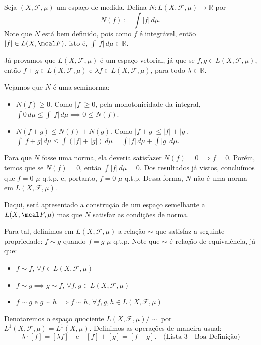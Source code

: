 Seja $(X, \mathcal{F}, \mu)$ um espaço de medida. Defina $N: L(X, \mathcal{F}, \mu) \rightarrow \mathbb{R}$ por
$$ N(f) := \int |f| \, d\mu. $$
Note que $N$ está bem definido, pois como $f$ é integrável, então $|f| \in L(X, \mcal F)$, 
isto é, $\int |f| \, d\mu \in \mathbb{R}$.

Já provamos que $L(X, \mathcal{F}, \mu)$ é um espaço vetorial, já que se $f, g \in L(X, \mathcal{F}, \mu)$, então $f+g \in L(X, \mathcal{F}, \mu)$ e $\lambda f \in L(X, \mathcal{F}, \mu)$, para todo $\lambda \in \mathbb{R}$.

\bigline
\noindent
Vejamos que $N$ é uma seminorma:
\begin{itemize}
    \item[i)] $N(f) \ge 0$. Como $|f| \ge 0$, pela monotonicidade da integral, $\int 0 \, d\mu \le \int |f| \, d\mu \implies 0 \le N(f)$.
    \item[ii)] $N(f+g) \le N(f) + N(g)$. Como $|f+g| \le |f| + |g|$, $\int |f+g| \, d\mu \le \int (|f| + |g|) \, d\mu = \int |f| \, d\mu + \int |g| \, d\mu$.
\end{itemize}
\bigline

Para que $N$ fosse uma norma, ela deveria satisfazer $N(f) = 0 \implies f = 0$. Porém, temos que se $N(f) = 0$, então $\int |f| \, d\mu = 0$. Dos resultados já vistos, concluímos que $f = 0$ $\mu$-q.t.p. e, portanto, $f = 0$ $\mu$-q.t.p. Dessa forma, $N$ não é uma norma em $L(X, \mathcal{F}, \mu)$.

Daqui, será apresentado a construção de um espaço semelhante a $L(X, \mcal F, \mu)$ 
mas que $N$ satisfaz as condições de norma.

Para tal, definimos em $L(X, \mathcal{F}, \mu)$ a relação $\sim$ que satisfaz a seguinte
propriedade: $f \sim g$ quando $f = g$ $\mu$-q.t.p.
Note que $\sim$ é relação de equivalência, já que:
\begin{itemize}
    \item $f \sim f$, $\forall f \in L(X, \mathcal{F}, \mu)$
    \item $f \sim g \implies g \sim f$, $\forall f, g \in L(X, \mathcal{F}, \mu)$
    \item $f \sim g$ e $g \sim h \implies f \sim h$, $\forall f, g, h \in L(X, \mathcal{F}, \mu)$
\end{itemize}

Denotaremos o espaço quociente $L(X, \mathcal{F}, \mu) / \sim$ por $L^1(X, \mathcal{F}, \mu) = L^1(X, \mu)$. Definimos as operações de maneira usual:
$$ \lambda \cdot [f] = [\lambda f] \quad \text{e} \quad [f] + [g] = [f+g]. \quad \text{(Lista 3 - Boa Definição)} $$

